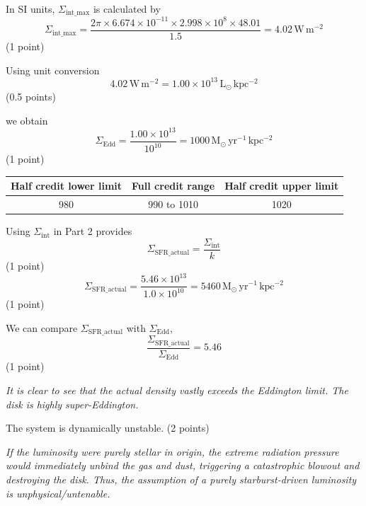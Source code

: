\begin{description}
  In SI units, $\Sigma_{\mathrm{int\_max}}$ is calculated by
  \[ \Sigma_{\mathrm{int\_max}}
     = \frac{2\pi \times 6.674 \times 10^{-11} \times 2.998 \times 10^{8} \times 48.01}{1.5}
     = 4.02\,\mathrm{W\,m^{-2}} \]
  \hfill(1 point)

  Using unit conversion
  \[ 4.02\,\mathrm{W\,m^{-2}} = 1.00 \times 10^{13}\,\mathrm{L_\odot\,kpc^{-2}} \]
  \hfill(0.5 points)

  we obtain
  \[ \Sigma_{\mathrm{Edd}} = \frac{1.00 \times 10^{13}}{10^{10}}
     = 1000\,\mathrm{M_\odot\,yr^{-1}\,kpc^{-2}} \]
  \hfill(1 point)

  \begin{center}
  \begin{tabular}{ccc}
  \toprule
  Half credit lower limit & Full credit range & Half credit upper limit \\
  \midrule
  980 & 990 to 1010 & 1020 \\
  \bottomrule
  \end{tabular}
  \end{center}

\item[(c)] Using $\Sigma_{\mathrm{int}}$ in Part 2 provides
  \[ \Sigma_{\mathrm{SFR\_actual}} = \frac{\Sigma_{\mathrm{int}}}{k} \]
  \hfill(1 point)
  \[ \Sigma_{\mathrm{SFR\_actual}}
     = \frac{5.46 \times 10^{13}}{1.0 \times 10^{10}}
     = 5460\,\mathrm{M_\odot\,yr^{-1}\,kpc^{-2}} \]
  \hfill(1 point)

  We can compare $\Sigma_{\mathrm{SFR\_actual}}$ with $\Sigma_{\mathrm{Edd}}$,
  \[ \frac{\Sigma_{\mathrm{SFR\_actual}}}{\Sigma_{\mathrm{Edd}}} = 5.46 \]
  \hfill(1 point)

  \emph{It is clear to see that the actual density vastly exceeds the
  Eddington limit. The disk is highly super-Eddington.}

  The system is dynamically unstable. \hfill(2 points)

  \emph{If the luminosity were purely stellar in origin, the extreme
  radiation pressure would immediately unbind the gas and dust, triggering a
  catastrophic blowout and destroying the disk. Thus, the assumption of a
  purely starburst-driven luminosity is unphysical/untenable.}
\end{description}

